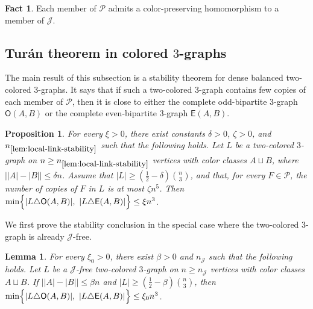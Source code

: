 \documentclass[10pt,a4paper]{article}
\theoremstyle{plain}
\newtheorem{lemma}[lemma]{Lemma}
\newtheorem{proposition}[proposition]{Proposition}
\theoremstyle{definition}
\newtheorem{fact}[fact]{Fact}
\begin{document}
\begin{fact}\label{lem:P-to-J-homomorphisms}
Each member of $\mathcal P$ admits a color-preserving homomorphism to a member of $\mathcal J$.
\end{fact}


\subsection{Tur\'{a}n theorem in colored \texorpdfstring{$3$}{3}-graphs}\label{SUBSEC:exact-key-lemmas}

The main result of this subsection is a stability theorem for dense balanced two-colored $3$-graphs.
It says that if such a two-colored $3$-graph contains few copies of each member of $\mathcal P$, then it is close to either the complete odd-bipartite $3$-graph $\mathsf O(A,B)$ or the complete even-bipartite $3$-graph $\mathsf E(A,B)$.

\begin{proposition}\label{lem:local-link-stability}
For every $\xi>0$, there exist constants $\delta>0$, $\zeta>0$, and $n_{\ref{lem:local-link-stability}}$ such that the following holds. Let $L$ be a two-colored $3$-graph on $n\ge n_{\ref{lem:local-link-stability}}$ vertices with color classes $A\sqcup B$, where $\bigl||A|-|B|\bigr|\le \delta n$. Assume that $|L|\ge \left(\frac12-\delta\right)\binom n3$, and that, for every $F\in\mathcal P$, the number of copies of $F$ in $L$ is at most $\zeta n^5$. Then $\min\Bigl\{|L\triangle \mathsf O(A,B)|,\ |L\triangle \mathsf E(A,B)|\Bigr\} \le \xi n^3$.
\end{proposition}

We first prove the stability conclusion in the special case where the two-colored $3$-graph is already $\mathcal J$-free.

\begin{lemma}\label{lem:J-free-local-link-stability}
For every $\xi_0>0$, there exist $\beta>0$ and $n_{\mathcal J}$ such that the following holds.
Let $L$ be a $\mathcal J$-free two-colored $3$-graph on $n\ge n_{\mathcal J}$ vertices with color classes $A\sqcup B$.
If $\bigl||A|-|B|\bigr|\le \beta n$ and $|L|\ge \left(\frac12-\beta\right)\binom n3$, then $\min\Bigl\{|L\triangle \mathsf O(A,B)|,\ |L\triangle \mathsf E(A,B)|\Bigr\} \le \xi_0 n^3$. 
\end{lemma}
\end{document}
